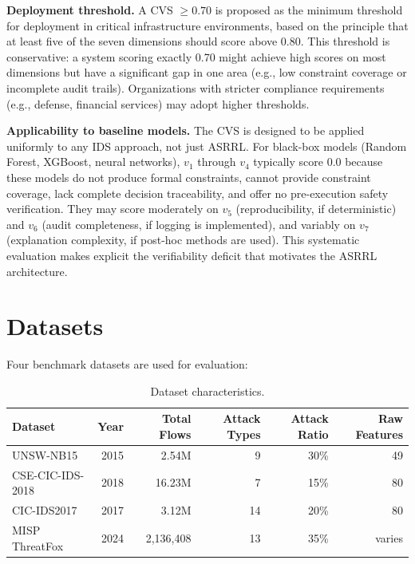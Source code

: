 \documentclass[12pt, letterpaper, oneside]{report}
\newcommand{\ASRRL}{\textsc{ASRRL}}
\begin{document}
\textbf{Deployment threshold.} A CVS $\geq 0.70$ is proposed as the minimum threshold for deployment in critical infrastructure environments, based on the principle that at least five of the seven dimensions should score above 0.80. This threshold is conservative: a system scoring exactly 0.70 might achieve high scores on most dimensions but have a significant gap in one area (e.g., low constraint coverage or incomplete audit trails). Organizations with stricter compliance requirements (e.g., defense, financial services) may adopt higher thresholds.

\textbf{Applicability to baseline models.} The CVS is designed to be applied uniformly to any IDS approach, not just \ASRRL{}. For black-box models (Random Forest, XGBoost, neural networks), $v_1$ through $v_4$ typically score 0.0 because these models do not produce formal constraints, cannot provide constraint coverage, lack complete decision traceability, and offer no pre-execution safety verification. They may score moderately on $v_5$ (reproducibility, if deterministic) and $v_6$ (audit completeness, if logging is implemented), and variably on $v_7$ (explanation complexity, if post-hoc methods are used). This systematic evaluation makes explicit the verifiability deficit that motivates the \ASRRL{} architecture.


\section{Datasets}
\label{sec:datasets}

Four benchmark datasets are used for evaluation:

\begin{table}[htbp]
\centering
\caption{Dataset characteristics.}
\label{tab:datasets}
\small
\begin{tabular}{lrrrrr}
\toprule
\textbf{Dataset} & \textbf{Year} & \textbf{Total Flows} & \textbf{Attack Types} & \textbf{Attack Ratio} & \textbf{Raw Features} \\
\midrule
UNSW-NB15 & 2015 & 2.54M & 9 & 30\% & 49 \\
CSE-CIC-IDS-2018 & 2018 & 16.23M & 7 & 15\% & 80 \\
CIC-IDS2017 & 2017 & 3.12M & 14 & 20\% & 80 \\
MISP ThreatFox & 2024 & 2,136,408 & 13 & 35\% & varies \\
\bottomrule
\end{tabular}
\end{table}
\end{document}
